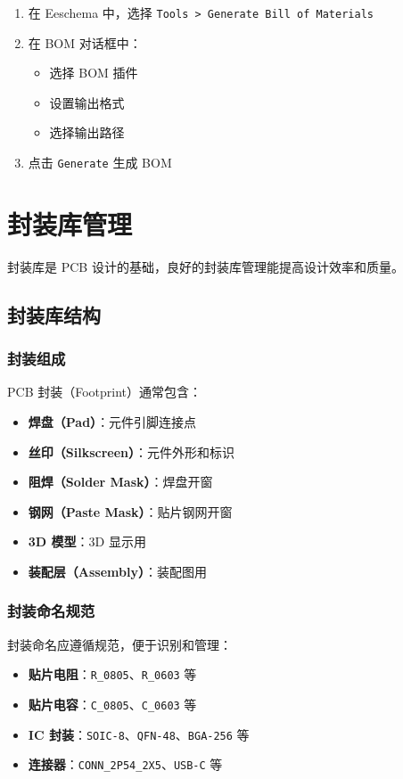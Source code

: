 \begin{enumerate}
  \item 在 Eeschema 中，选择 \lstinline{Tools > Generate Bill of Materials}
  \item 在 BOM 对话框中：
    \begin{itemize}
      \item 选择 BOM 插件
      \item 设置输出格式
      \item 选择输出路径
    \end{itemize}
  \item 点击 \lstinline{Generate} 生成 BOM
\end{enumerate}

\section{封装库管理}

封装库是 PCB 设计的基础，良好的封装库管理能提高设计效率和质量。

\subsection{封装库结构}

\subsubsection{封装组成}

PCB 封装（Footprint）通常包含：

\begin{itemize}
  \item \textbf{焊盘（Pad）}：元件引脚连接点
  \item \textbf{丝印（Silkscreen）}：元件外形和标识
  \item \textbf{阻焊（Solder Mask）}：焊盘开窗
  \item \textbf{钢网（Paste Mask）}：贴片钢网开窗
  \item \textbf{3D 模型}：3D 显示用
  \item \textbf{装配层（Assembly）}：装配图用
\end{itemize}

\subsubsection{封装命名规范}

封装命名应遵循规范，便于识别和管理：

\begin{itemize}
  \item \textbf{贴片电阻}：\lstinline{R_0805}、\lstinline{R_0603} 等
  \item \textbf{贴片电容}：\lstinline{C_0805}、\lstinline{C_0603} 等
  \item \textbf{IC 封装}：\lstinline{SOIC-8}、\lstinline{QFN-48}、\lstinline{BGA-256} 等
  \item \textbf{连接器}：\lstinline{CONN_2P54_2X5}、\lstinline{USB-C} 等
\end{itemize}

